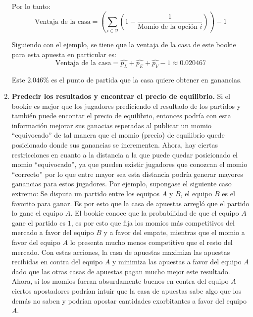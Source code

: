 \begin{enumerate}
 Por lo tanto:
 \[\text{Ventaja de la casa} =  \left(\sum_{i \in \mathcal{O}}{\left(1 - \frac{1}{\text{Momio de la opción } i}\right)}\right) - 1\] 

 Siguiendo con el ejemplo, se tiene que la ventaja de la casa de este bookie para esta apuesta en particular es:
 \[\text{Ventaja de la casa} = \hat{p_L} + \hat{p_E} + \hat{p_V} - 1 \approx 0.020467\]

 Este $2.046\%$ es el punto de partida que la casa quiere obtener en ganancias. 


  \item \textbf{Predecir los resultados y encontrar el precio de equilibrio.} Si el bookie es mejor que los jugadores prediciendo el resultado de los partidos y también puede encontar el precio de equilibrio, entonces podría con esta información mejorar sus ganacias esperadas al publicar un momio ``equivocado'' de tal manera que el momio (precio) de equilibrio quede posicionado donde sus ganancias se incrementen. Ahora, hay ciertas restricciones en cuanto a la distancia a la que puede quedar posicionado el momio ``equivocado'', ya que pueden existir jugadores que conozcan el momio ``correcto'' por lo que entre mayor sea esta distancia podría generar mayores ganancias para estos jugadores. Por ejemplo, supongase el siguiente caso extremo: Se disputa un partido entre los equipos $A$ y $B$, el equipo $B$ es el favorito para ganar. Es por esto que la casa de apuestas arregló que el partido lo gane el equipo $A$. El bookie conoce que la probabilidad de que el equipo $A$ gane el partido es $1$, es por esto que fija los momios más competitivos del mercado a favor del equipo $B$ y a favor del empate, mientras que el momio a favor del equipo $A$ lo presenta mucho menos competitivo que el resto del mercado. Con estas acciones, la casa de apuestas maximiza las apuestas recibidas en contra del equipo $A$ y minimiza las apuestas a favor del equipo $A$ dado que las otras casas de apuestas pagan mucho mejor este resultado. Ahora, si los momios fueran absurdamente buenos en contra del equipo $A$ ciertos apostadores podrían intuir que la casa de apuestas sabe algo que los demás no saben y podrían apostar cantidades exorbitantes a favor del equipo $A$.

 \end{enumerate}


